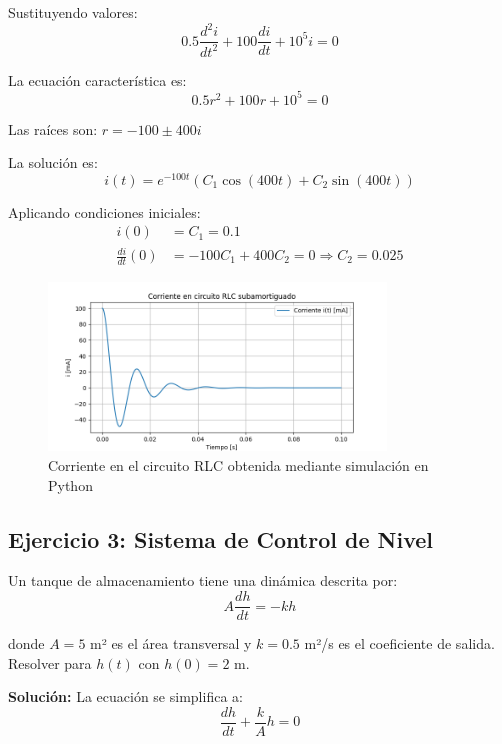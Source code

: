 \documentclass[12pt]{article}
\begin{document}
Sustituyendo valores:
\begin{equation}
    0.5 \frac{d^2 i}{dt^2} + 100 \frac{di}{dt} + 10^5 i = 0
\end{equation}

La ecuación característica es:
\begin{equation}
    0.5r^2 + 100r + 10^5 = 0
\end{equation}

Las raíces son: $r = -100 \pm 400i$

La solución es:
\begin{equation}
    i(t) = e^{-100t} (C_1 \cos(400t) + C_2 \sin(400t))
\end{equation}

Aplicando condiciones iniciales:
\begin{align}
    i(0) &= C_1 = 0.1 \\
    \frac{di}{dt}(0) &= -100C_1 + 400C_2 = 0 \Rightarrow C_2 = 0.025
\end{align}

\begin{figure}[H]
    \centering
    \includegraphics[width=0.8\textwidth]{imagen-ejercicio2.png}
    \caption{Corriente en el circuito RLC obtenida mediante simulación en Python}
\end{figure}

\subsection{Ejercicio 3: Sistema de Control de Nivel}

Un tanque de almacenamiento tiene una dinámica descrita por:
\begin{equation}
    A \frac{dh}{dt} = -k h
\end{equation}

donde $A = 5$ m² es el área transversal y $k = 0.5$ m²/s es el coeficiente de salida. Resolver para $h(t)$ con $h(0) = 2$ m.

\textbf{Solución:}
La ecuación se simplifica a:
\begin{equation}
    \frac{dh}{dt} + \frac{k}{A} h = 0
\end{equation}
\end{document}

